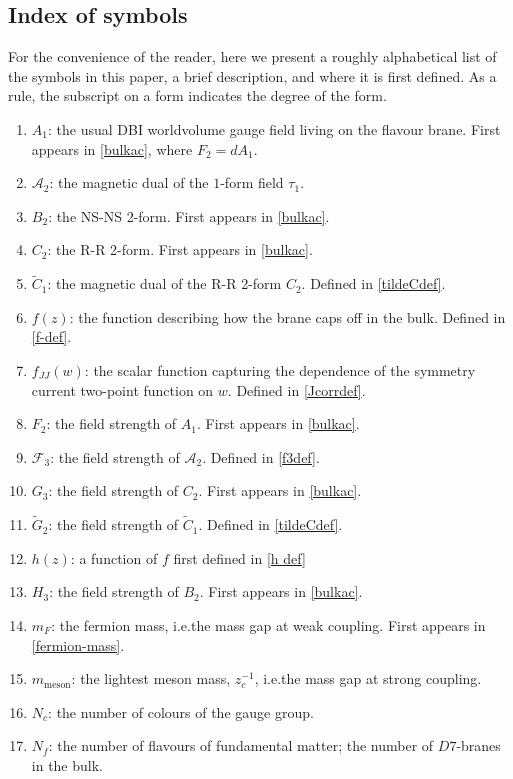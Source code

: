 \documentclass[aps,preprint,nofootinbib,preprintnumbers,eqsecnum,superscriptaddress]{revtex4}
\begin{document}
\begin{appendix}
\section{Index of symbols}
\label{symbol-index}
For the convenience of the reader, here we present a roughly alphabetical list of the symbols in this paper, a brief description, and where it is first defined. As a rule, the subscript on a form indicates the degree of the form.
\begin{enumerate}
\item $A_1$: the usual DBI worldvolume gauge field living on the flavour brane. First appears in \eqref{bulkac}, where $F_{2} = dA_1$. 
\item $\mathcal{A}_2$: the magnetic dual of the $1$-form field $\tau_1$.
\item $B_2$: the NS-NS 2-form. First appears in \eqref{bulkac}. 
\item $C_2$: the R-R 2-form. First appears in \eqref{bulkac}. 
\item $\tilde{C}_1$: the magnetic dual of the R-R 2-form $C_2$. Defined in \eqref{tildeCdef}. 
\item $f(z)$: the function describing how the brane caps off in the bulk. Defined in \eqref{f-def}.
\item $f_{JJ}(w)$: the scalar function capturing the dependence of the symmetry current two-point function on $w$. Defined in \eqref{Jcorrdef}.
\item $F_2$: the field strength of $A_1$. First appears in \eqref{bulkac}.
\item $\mathcal{F}_3$: the field strength of $\mathcal{A}_2$. Defined in \eqref{f3def}.
\item $G_3$: the field strength of $C_2$. First appears in \eqref{bulkac}.
\item $\tilde{G}_2$: the field strength of $\tilde{C}_1$. Defined in \eqref{tildeCdef}.
\item $h(z)$: a function of $f$ first defined in \eqref{h def}
\item $H_3$: the field strength of $B_2$. First appears in \eqref{bulkac}.
\item $m_F$: the fermion mass, i.e.the mass gap at weak coupling. First appears in \eqref{fermion-mass}.
\item $m_{\text{meson}}$: the lightest meson mass, $z_c^{-1}$, i.e.the mass gap at strong coupling.
\item $N_c$: the number of colours of the gauge group.
\item $N_f$: the number of flavours of fundamental matter; the number of $D7$-branes in the bulk.

\end{enumerate}
\end{appendix}
\end{document}
